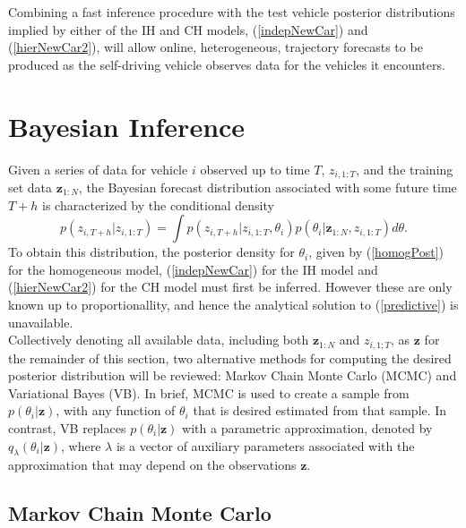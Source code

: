 \documentclass[12pt,a4paper]{article}\usepackage[]{graphicx}\usepackage[]{color}
\begin{document}
Combining a fast inference procedure with the test vehicle posterior distributions implied by either of the IH and CH models, (\ref{indepNewCar}) and (\ref{hierNewCar2}), will allow online, heterogeneous, trajectory forecasts to be produced as the self-driving vehicle observes data for the vehicles it encounters.

\section{Bayesian Inference}
\label{sec:Inference}

Given a series of data for vehicle $i$ observed up to time $T$, $z_{i, 1:T}$, and the training set data $\textbf{z}_{1:N}$, the Bayesian forecast distribution associated with some future time $T+h$ is characterized by the conditional density
\begin{equation}
\label{predictive}
p(z_{i, T+h} | z_{i, 1:T}) =\int p(z_{i, T+h}|z_{i, 1:T}, \theta_i) p(\theta_i | \textbf{z}_{1:N}, z_{i, 1:T}) d\theta.
\end{equation}
To obtain this distribution, the posterior density for $\theta_i$, given by (\ref{homogPost}) for the homogeneous model, (\ref{indepNewCar}) for the IH model and (\ref{hierNewCar2}) for the CH model must first be inferred. However these are only known up to proportionallity, and hence the analytical solution to (\ref{predictive}) is unavailable.
\\

Collectively denoting all available data, including both $\textbf{z}_{1:N}$ and $z_{i, 1:T}$, as $\textbf{z}$ for the remainder of this section, two alternative methods for computing the desired posterior distribution will be reviewed: Markov Chain Monte Carlo (MCMC) and Variational Bayes (VB). In brief, MCMC is used to create a sample from $p(\theta_i | \textbf{z})$, with any function of $\theta_i$ that is desired estimated from that sample. In contrast, VB replaces $p(\theta_i | \textbf{z})$ with a parametric approximation, denoted by $q_{\lambda}(\theta_i |\textbf{z})$, where $\lambda$ is a vector of auxiliary parameters associated with the approximation that may depend on the observations $\textbf{z}$.

\subsection{Markov Chain Monte Carlo}
\label{subsec:MCMC}
\end{document}
